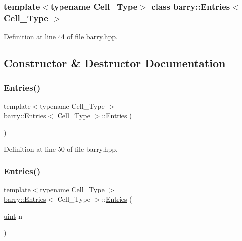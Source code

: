 \subsubsection*{template$<$typename Cell\+\_\+\+Type$>$\newline
class barry\+::\+Entries$<$ Cell\+\_\+\+Type $>$}



Definition at line 44 of file barry.\+hpp.



\subsection{Constructor \& Destructor Documentation}
\mbox{\label{classbarry_1_1_entries_aa51d37ad8e5f441fd64c954dfab9ad04}} 
\subsubsection{\texorpdfstring{Entries()}{Entries()}\hspace{0.1cm}{\footnotesize\ttfamily [1/2]}}
{\footnotesize\ttfamily template$<$typename Cell\+\_\+\+Type $>$ \\
\hyperlink{classbarry_1_1_entries}{barry\+::\+Entries}$<$ Cell\+\_\+\+Type $>$\+::\hyperlink{classbarry_1_1_entries}{Entries} (\begin{DoxyParamCaption}{ }\end{DoxyParamCaption})\hspace{0.3cm}{\ttfamily [inline]}}



Definition at line 50 of file barry.\+hpp.

\mbox{\label{classbarry_1_1_entries_a22dda1d0afd4fbe4b658e55ca1b61f16}} 
\subsubsection{\texorpdfstring{Entries()}{Entries()}\hspace{0.1cm}{\footnotesize\ttfamily [2/2]}}
{\footnotesize\ttfamily template$<$typename Cell\+\_\+\+Type $>$ \\
\hyperlink{classbarry_1_1_entries}{barry\+::\+Entries}$<$ Cell\+\_\+\+Type $>$\+::\hyperlink{classbarry_1_1_entries}{Entries} (\begin{DoxyParamCaption}\item[{\hyperlink{namespacebarry_a11dfc53ddb4672278319aa04f1e09a6c}{uint}}]{n }\end{DoxyParamCaption})\hspace{0.3cm}{\ttfamily [inline]}}



